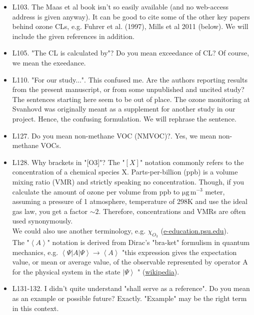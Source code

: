 \documentclass{scrartcl}
\begin{document}
\begin{itemize}
\item {\color{blue}L103. The Maas et al book isn't so easily available (and no web-access address is given anyway). It can be good to cite some of the other key papers behind ozone CLs, e.g. Fuhrer et al. (1997), Mills et al 2011 (below).} We will include the given references in addition.

\item {\color{blue}L105. "The CL is calculated by"? Do you mean exceedance of CL?} Of course, we mean the exeedance.

\item {\color{blue}L110. "For our study...". This confused me. Are the authors reporting results from the present manuscript, or from some unpublished and uncited study? The sentences starting here seem to be out of place.}
The ozone monitoring at Svanhovd was originally meant as a supplement for another study in our project. Hence, the confusing formulation. We will rephrase the sentence.

\item {\color{blue}L127. Do you mean non-methane VOC (NMVOC)?.} Yes, we mean non-methane VOCs.

\item {\color{blue}L128. Why brackets in "[O3]"?}
The "$[X]$" notation commonly refers to the concentration of a chemical species X. Parts-per-billion (ppb) is a volume mixing ratio (VMR) and strictly speaking no concentration. Though, if you calculate the amount of ozone per volume from ppb to $\mathrm{\mu g\,m^{-3}}$ meter, assuming a pressure of 1 atmosphere, temperature of 298K and use the ideal gas law, you get a factor $\sim 2$. Therefore, concentrations and VMRs are often used synonymously. \\We could also use another terminology, e.g. $\chi_{O_3}$ (\href{https://www.e-education.psu.edu/meteo300/node/534}{e-education.psu.edu}). \\The "$\left<A\right>$" notation is derived from Dirac's "bra-ket" formulism in quantum mechanics, e.g. $\left<\Psi |A|\Psi \right>\rightarrow \left<A\right>$ "this expression gives the expectation value, or mean or average value, of the observable represented by operator A for the physical system in the state $\left|\Psi \right>$ " (\href{https://en.wikipedia.org/wiki/Bra%E2%80%93ket_notation}{wikipedia}).

\item {\color{blue}L131-132. I didn't quite understand "shall serve as a reference". Do you mean as an example or possible future?}
Exactly. "Example" may be the right term in this context. 


\end{itemize}
\end{document}
